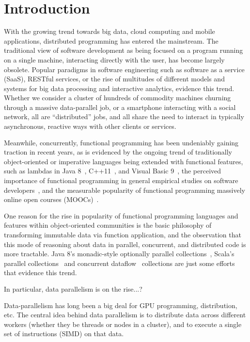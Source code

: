 \documentclass{llncs}
\begin{document}
\section{Introduction}

With the growing trend towards big data, cloud computing and mobile
applications, distributed programming has entered the mainstream. The
traditional view of software development as being focused on a program running
on a single machine, interacting directly with the user, has become largely
obsolete. Popular paradigms in software engineering such as software as a
service (SaaS), RESTful services, or the rise of multitudes of different
models and systems for big data processing and interactive analytics, evidence
this trend. Whether we consider a cluster of hundreds of commodity machines
churning through a massive data-parallel job, or a smartphone interacting with
a social network, all are ``distributed'' jobs, and all share the need to
interact in typically asynchronous, reactive ways with other clients or
services.

Meanwhile, concurrently, functional programming has been undeniably gaining
traction in recent years, as is evidenced by the ongoing trend of
traditionally object-oriented or imperative languages being extended with
functional features, such as lambdas in {Java 8}~\cite{JavaLambdas},
C++11~\cite{CplusplusLambas}, and Visual Basic 9~\cite{Meijer}, the perceived
importance of functional programming in general empirical studies on software
developers~\cite{PLAdoption}, and the measurable popularity of functional
programming massively online open courses (MOOCs)~\cite{ICSEMOOC}.

One reason for the rise in popularity of functional programming languages and
features within object-oriented communities is the basic philosophy of
transforming immutable data via function application, and the observation that
this mode of reasoning about data in parallel, concurrent, and distributed
code is more tractable. {Java 8}'s monadic-style optionally parallel
collections~\cite{JavaLambdas}, Scala's parallel
collections~\cite{ScalaParColls} and concurrent dataflow~\cite{FlowPools}
collections are just some efforts that evidence this trend.

In particular, data parallelism is on the rise...?

Data-parallelism has long been a big deal for GPU programming, distribution,
etc.  The central idea behind data parallelism is to distribute data across
different workers (whether they be threads or nodes in a cluster), and to
execute a single set of instructions (SIMD) on that data.
\end{document}
